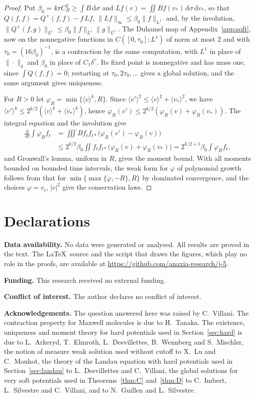 \documentclass[11pt]{amsart}
\theoremstyle{definition}
\newcommand{\dd}{\,\mathrm{d}}
\newcommand{\jb}[1]{\langle #1\rangle}
\begin{document}
\begin{proof}
Put $\beta_0=4\pi C_B^2\ge\int B\dd\sigma$ and $Lf(v)=\iint Bf(v_*)\dd\sigma\dd v_*$, so that $Q(f,f)=Q^+(f,f)-f\,Lf$, $\|Lf\|_\infty\le\beta_0\|f\|_{L^1}$ and, by the involution, $\|Q^+(f,g)\|_{L^1}\le\beta_0\|f\|_{L^1}\|g\|_{L^1}$. The Duhamel map of Appendix~\ref{app:soft}, now on the nonnegative functions in $C([0,\tau_0];L^1)$ of norm at most $2$ and with $\tau_0=(16\beta_0)^{-1}$, is a contraction by the same computation, with $L^1$ in place of $\|\cdot\|_\delta$ and $\beta_0$ in place of $C_1\delta^\gamma$. Its fixed point is nonnegative and has mass one, since $\int Q(f,f)=0$; restarting at $\tau_0,2\tau_0,\dots$ gives a global solution, and the same argument gives uniqueness.

For $R>0$ let $\varphi_R=\min\{\jb{v}^k,R\}$. Since $\jb{v'}^2\le\jb{v}^2+\jb{v_*}^2$, we have $\jb{v'}^k\le2^{k/2}(\jb{v}^k+\jb{v_*}^k)$, hence $\varphi_R(v')\le2^{k/2}(\varphi_R(v)+\varphi_R(v_*))$. The integral equation and the involution give
\[
\begin{aligned}\frac{\dd}{\dd t}\int\varphi_Rf_t&=\iiint Bf_tf_{t*}\big(\varphi_R(v')-\varphi_R(v)\big)\\&\le2^{k/2}\beta_0\iint f_tf_{t*}\big(\varphi_R(v)+\varphi_R(v_*)\big)=2^{k/2+1}\beta_0\int\varphi_Rf_t ,\end{aligned}
\]
and Gronwall's lemma, uniform in $R$, gives the moment bound. With all moments bounded on bounded time intervals, the weak form for $\varphi$ of polynomial growth follows from that for $\min\{\max\{\varphi,-R\},R\}$ by dominated convergence, and the choices $\varphi=v_i$, $|v|^2$ give the conservation laws.
\end{proof}

\section*{Declarations}

\noindent\textbf{Data availability.} No data were generated or analysed. All results are proved in the text. The \LaTeX\ source and the script that draws the figures, which play no role in the proofs, are available at \url{https://github.com/anaxia-research/j-5}.

\smallskip\noindent\textbf{Funding.} This research received no external funding.

\smallskip\noindent\textbf{Conflict of interest.} The author declares no conflict of interest.

\smallskip\noindent\textbf{Acknowledgements.} The question answered here was raised by C.~Villani. The contraction property for Maxwell molecules is due to H.~Tanaka. The existence, uniqueness and moment theory for hard potentials used in Section~\ref{sec:hard} is due to L.~Arkeryd, T.~Elmroth, L.~Desvillettes, B.~Wennberg and S.~Mischler, the notion of measure weak solution used without cutoff to X.~Lu and C.~Mouhot, the theory of the Landau equation with hard potentials used in Section~\ref{sec:landau} to L.~Desvillettes and C.~Villani, the global solutions for very soft potentials used in Theorems~\ref{thm:C} and~\ref{thm:D} to C.~Imbert, L.~Silvestre and C.~Villani, and to N.~Guillen and L.~Silvestre.
\end{document}
